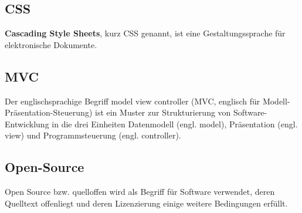 \documentclass[11pt,a4paper]{article}
\begin{document}
\subsection{CSS}
\textbf{Cascading Style Sheets}, kurz CSS genannt, ist eine Gestaltungssprache für elektronische Dokumente.

\subsection{MVC}
Der englischsprachige Begriff model view controller (MVC, englisch für Modell-Präsentation-Steuerung) ist ein Muster zur Strukturierung von Software-Entwicklung in die drei Einheiten Datenmodell (engl. model), Präsentation (engl. view) und Programmsteuerung (engl. controller).

\subsection{Open-Source}
Open Source bzw. quelloffen wird als Begriff für Software verwendet, deren Quelltext offenliegt und deren Lizenzierung einige weitere Bedingungen erfüllt.
\end{document}
